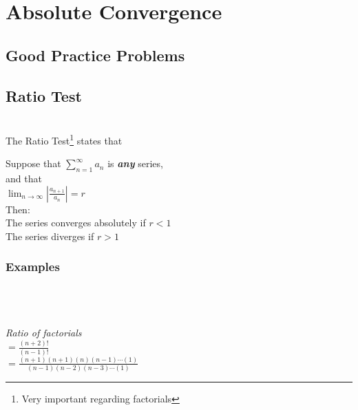 \documentclass{article}
\begin{document}
\section{\centering \huge Absolute Convergence \\ }
    \subsection{Good Practice Problems}
    \subsection{Ratio Test} 
    \hrulefill \\[10pt]

    The Ratio Test\footnote{Very important regarding factorials} states that 
        
        \begingroup
        \centering
        Suppose that $\displaystyle \sum_{n=1}^{\infty} a_n$ is \textit{\textbf{any}} series,\\
        and that\\[5pt]\textbf{}
        $\displaystyle \lim_{n \rightarrow \infty} \left| \frac{a_{n+1}}{a_n} \right| = r$\\[10pt]
        Then: \\[5pt]
        The series converges absolutely if $r < 1$\\
        The series diverges if $r > 1$\\
        \endgroup

    \subsubsection{Examples}

        \begingroup
        \centering

        \\

        \hrulefill \\[10pt]

        \\[5pt]
        \textit{Ratio of factorials}\\[15pt]

        $=\frac{(n+2)!}{(n-1)!}$\\[15pt]
        
        $= \frac{(n+1)(n+1)(n)(n-1)\cdots(1)}{(n-1)(n-2)(n-3)\cdots(1)}$\\[15pt]
        
\end{document}
